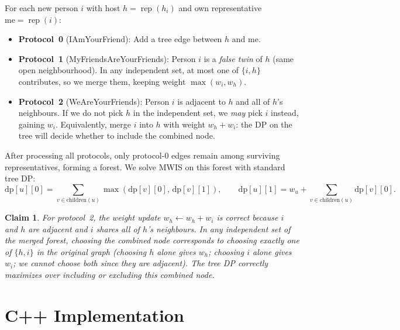 \documentclass[11pt,a4paper]{article}
\newtheorem{claim}[theorem]{Claim}
\begin{document}
For each new person $i$ with host $h = \operatorname{rep}(h_i)$ and own representative $\text{me} = \operatorname{rep}(i)$:

\begin{itemize}
  \item \textbf{Protocol~0} (IAmYourFriend): Add a tree edge between $h$ and $\text{me}$.

  \item \textbf{Protocol~1} (MyFriendsAreYourFriends): Person $i$ is a \emph{false twin} of $h$ (same open neighbourhood). In any independent set, at most one of $\{i, h\}$ contributes, so we merge them, keeping weight $\max(w_i, w_h)$.

  \item \textbf{Protocol~2} (WeAreYourFriends): Person $i$ is adjacent to $h$ and all of $h$'s neighbours. If we do not pick $h$ in the independent set, we \emph{may} pick $i$ instead, gaining $w_i$. Equivalently, merge $i$ into $h$ with weight $w_h + w_i$: the DP on the tree will decide whether to include the combined node.
\end{itemize}

After processing all protocols, only protocol-0 edges remain among surviving representatives, forming a forest. We solve MWIS on this forest with standard tree DP:
\[
  \text{dp}[u][0] = \sum_{v \in \text{children}(u)} \max(\text{dp}[v][0],\, \text{dp}[v][1]), \qquad
  \text{dp}[u][1] = w_u + \sum_{v \in \text{children}(u)} \text{dp}[v][0].
\]

\begin{claim}
For protocol~2, the weight update $w_h \gets w_h + w_i$ is correct because $i$ and $h$ are adjacent and $i$ shares all of $h$'s neighbours. In any independent set of the merged forest, choosing the combined node corresponds to choosing exactly one of $\{h, i\}$ in the original graph (choosing $h$ alone gives $w_h$; choosing $i$ alone gives $w_i$; we cannot choose both since they are adjacent). The tree DP correctly maximizes over including or excluding this combined node.
\end{claim}

\section{C++ Implementation}
\end{document}
